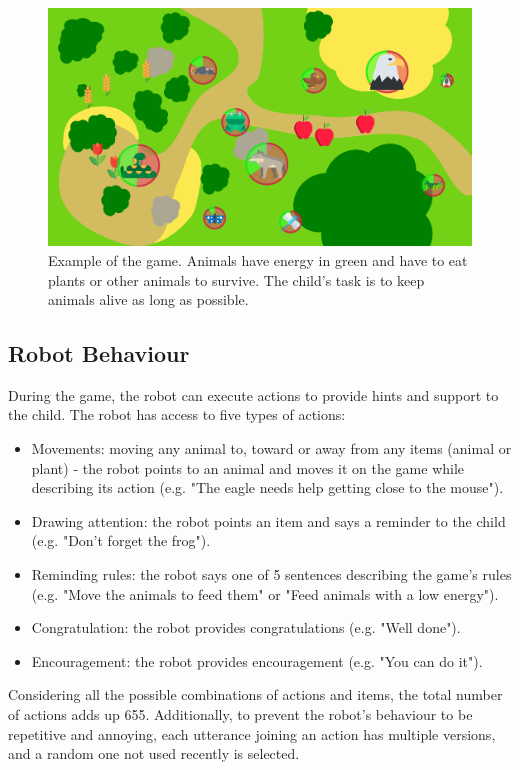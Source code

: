 \begin{figure}[ht]
	\centering
		\includegraphics[width=1\textwidth]{game.png}
		\captionsetup{width=.9\linewidth}
		\caption{Example of the game. Animals have energy in green and have to eat plants or other animals to survive. The child's task is to keep animals alive as long as possible.}
		\label{fig:tutoring_game}
\end{figure}

\subsection{Robot Behaviour}
 
During the game, the robot can execute actions to provide hints and support to the child. The robot has access to five types of actions:
\begin{itemize}
	\item Movements: moving any animal to, toward or away from any items (animal or plant) - the robot points to an animal and moves it on the game while describing its action (e.g. "The eagle needs help getting close to the mouse").
	\item Drawing attention: the robot points an item and says a reminder to the child (e.g. "Don't forget the frog").
	\item Reminding rules: the robot says one of 5 sentences describing the game's rules (e.g. "Move the animals to feed them" or "Feed animals with a low energy").
	\item Congratulation: the robot provides congratulations (e.g. "Well done").
	\item Encouragement: the robot provides encouragement (e.g. "You can do it").
\end{itemize}
Considering all the possible combinations of actions and items, the total number of actions adds up 655. Additionally, to prevent the robot's behaviour to be repetitive and annoying, each utterance joining an action has multiple versions, and a random one not used recently is selected. 

